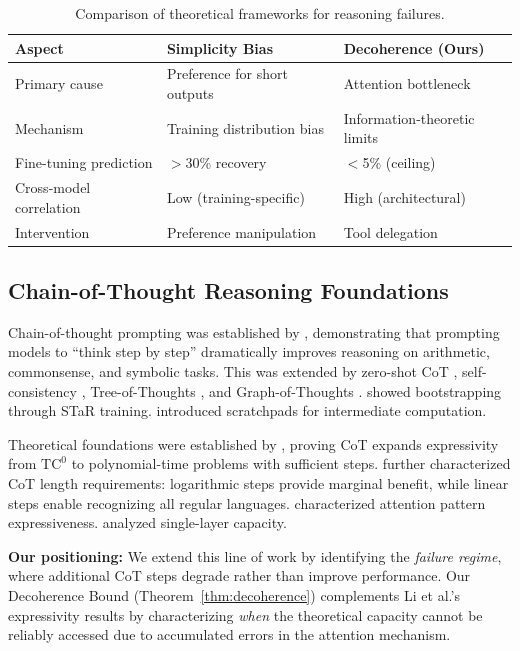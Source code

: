 \documentclass{article}
\theoremstyle{plain}
\theoremstyle{definition}
\theoremstyle{remark}
\begin{document}
\begin{table}[h]
	\centering
	\caption{Comparison of theoretical frameworks for reasoning failures.}
	\label{tab:related_comparison}
	\small
	\begin{tabular}{@{}p{2.5cm}p{3cm}p{3cm}@{}}
		\toprule
		\textbf{Aspect} & \textbf{Simplicity Bias} & \textbf{Decoherence (Ours)} \\
		\midrule
		Primary cause & Preference for short outputs & Attention bottleneck \\
		Mechanism & Training distribution bias & Information-theoretic limits \\
		Fine-tuning prediction & $>$30\% recovery & $<$5\% (ceiling) \\
		Cross-model correlation & Low (training-specific) & High (architectural) \\
		Intervention & Preference manipulation & Tool delegation \\
		\bottomrule
	\end{tabular}
\end{table}

\subsection{Chain-of-Thought Reasoning Foundations}

Chain-of-thought prompting was established by \citet{wei2022chain}, demonstrating that prompting models to ``think step by step'' dramatically improves reasoning on arithmetic, commonsense, and symbolic tasks. This was extended by zero-shot CoT \citep{kojima2022large}, self-consistency \citep{wang2023selfconsistency}, Tree-of-Thoughts \citep{yao2023tree}, and Graph-of-Thoughts \citep{besta2024graph}. \citet{zelikman2022star} showed bootstrapping through STaR training. \citet{nye2021improving} introduced scratchpads for intermediate computation.

Theoretical foundations were established by \citet{li2024chain}, proving CoT expands expressivity from $\text{TC}^0$ to polynomial-time problems with sufficient steps. \citet{merrill2024expressive} further characterized CoT length requirements: logarithmic steps provide marginal benefit, while linear steps enable recognizing all regular languages. \citet{feng2023expressiveness} characterized attention pattern expressiveness. \citet{sanford2024representational} analyzed single-layer capacity.

\textbf{Our positioning:} We extend this line of work by identifying the \emph{failure regime}, where additional CoT steps degrade rather than improve performance. Our Decoherence Bound (Theorem~\ref{thm:decoherence}) complements Li et al.'s expressivity results by characterizing \emph{when} the theoretical capacity cannot be reliably accessed due to accumulated errors in the attention mechanism.
\end{document}
